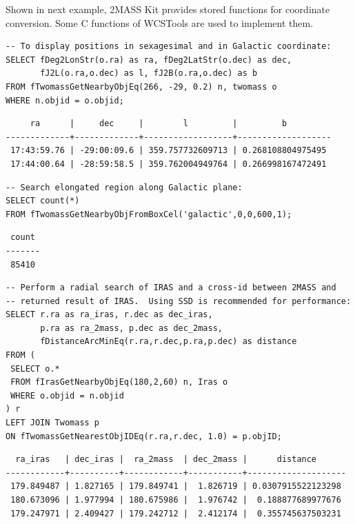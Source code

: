 Shown in next example, 2MASS Kit provides stored functions for coordinate conversion. Some C functions of WCSTools \citep{min_2006} are used to implement them.

\begin{verbatim}
-- To display positions in sexagesimal and in Galactic coordinate:
SELECT fDeg2LonStr(o.ra) as ra, fDeg2LatStr(o.dec) as dec, 
       fJ2L(o.ra,o.dec) as l, fJ2B(o.ra,o.dec) as b
FROM fTwomassGetNearbyObjEq(266, -29, 0.2) n, twomass o
WHERE n.objid = o.objid;
\end{verbatim}

{\small
\begin{verbatim}
     ra      |     dec     |        l         |         b         
-------------+-------------+------------------+-------------------
 17:43:59.76 | -29:00:09.6 | 359.757732609713 | 0.268108804975495
 17:44:00.64 | -28:59:58.5 | 359.762004949764 | 0.266998167472491
\end{verbatim}
}

\begin{verbatim}
-- Search elongated region along Galactic plane:
SELECT count(*) 
FROM fTwomassGetNearbyObjFromBoxCel('galactic',0,0,600,1);
\end{verbatim}

{\small
\begin{verbatim}
 count 
-------
 85410
\end{verbatim}
}

{\small
\begin{verbatim}
-- Perform a radial search of IRAS and a cross-id between 2MASS and
-- returned result of IRAS.  Using SSD is recommended for performance:
SELECT r.ra as ra_iras, r.dec as dec_iras,
       p.ra as ra_2mass, p.dec as dec_2mass,
       fDistanceArcMinEq(r.ra,r.dec,p.ra,p.dec) as distance
FROM (
 SELECT o.*
 FROM fIrasGetNearbyObjEq(180,2,60) n, Iras o
 WHERE o.objid = n.objid
) r
LEFT JOIN Twomass p
ON fTwomassGetNearestObjIDEq(r.ra,r.dec, 1.0) = p.objID;
\end{verbatim}
}

{\small
\begin{verbatim}
  ra_iras   | dec_iras |  ra_2mass  | dec_2mass |      distance      
------------+----------+------------+-----------+--------------------
 179.849487 | 1.827165 | 179.849741 |  1.826719 | 0.0307915522123298
 180.673096 | 1.977994 | 180.675986 |  1.976742 |  0.188877689977676
 179.247971 | 2.409427 | 179.242712 |  2.412174 |  0.355745637503231
\end{verbatim}
}


